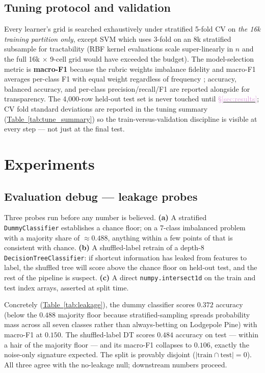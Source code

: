 \documentclass[conference]{IEEEtran}
\newcommand{\tabref}[1]{\hyperref[#1]{\textcolor{sage}{Table~\ref*{#1}}}}
\newcommand{\secref}[1]{\hyperref[#1]{\textcolor{plum}{\S\ref*{#1}}}}
\begin{document}
\subsection{Tuning protocol and validation}\label{sec:design:tune}
Every learner's grid is searched exhaustively under stratified 5-fold CV on
\emph{the 16k training partition only}, except SVM which uses 3-fold on an
8k stratified subsample for tractability (RBF kernel evaluations scale
super-linearly in $n$ and the full 16k $\times$ 9-cell grid would have
exceeded the budget). The model-selection metric is \textbf{macro-F1} because
the rubric weights imbalance fidelity and macro-F1 averages per-class F1 with
equal weight regardless of frequency \cite{sokolova2009pra}; accuracy, balanced
accuracy, and per-class precision/recall/F1 are reported alongside for
transparency. The 4{,}000-row held-out test set is never touched until
\secref{sec:results}; CV fold standard deviations are reported in the tuning
summary (\tabref{tab:tune_summary}) so the train-versus-validation discipline
is visible at every step --- not just at the final test.

\section{Experiments}\label{sec:exp}

\subsection{Evaluation debug --- leakage probes}\label{sec:exp:leakage}
Three probes run before any number is believed. \textbf{(a)} A stratified
\texttt{DummyClassifier} establishes a chance floor; on a 7-class imbalanced
problem with a majority share of $\approx 0.488$, anything within a few points
of that is consistent with chance. \textbf{(b)} A shuffled-label retrain of a
depth-8 \texttt{DecisionTreeClassifier}: if shortcut information has leaked
from features to label, the shuffled tree will score above the chance floor on
held-out test, and the rest of the pipeline is suspect. \textbf{(c)} A direct
\texttt{numpy.intersect1d} on the train and test index arrays, asserted at
split time.

Concretely (\tabref{tab:leakage}), the dummy classifier scores $0.372$ accuracy
(below the $0.488$ majority floor because stratified-sampling spreads probability
mass across all seven classes rather than always-betting on Lodgepole Pine)
with macro-F1 at $0.150$. The shuffled-label DT scores $0.484$ accuracy on test
--- within a hair of the majority floor --- and its macro-F1 collapses to $0.106$,
exactly the noise-only signature expected. The split is provably disjoint
($|\text{train} \cap \text{test}| = 0$). All three agree with the
no-leakage null; downstream numbers proceed.
\end{document}
